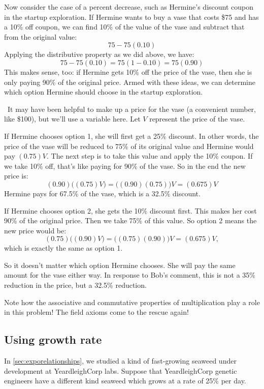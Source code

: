 Now consider the case of a percent decrease, such as Hermine's discount coupon in the startup exploration. If Hermine wants to buy a vase that costs \$75 and has a 10\% off coupon, we can find 10\% of the value of the vase and subtract that from the original value: \[75 - 75(0.10)\] Applying the distributive property as we did above, we have: \[75 - 75(0.10) = 75(1-0.10) = 75(0.90)\] This makes sense, too: if Hermine gets 10\% off the price of the vase, then she is only paying 90\% of the original price. Armed with these ideas, we can determine which option Hermine should choose in the startup exploration.

\begin{boxex}
\exsoln\ It may have been helpful to make up a price for the vase (a convenient number, like \$100), but we'll use a variable here. Let $V$ represent the price of the vase.

If Hermine chooses option 1, she will first get a 25\% discount. In other words, the price of the vase will be reduced to 75\% of its original value and Hermine would pay $(0.75)V$. The next step is to take this value and apply the 10\% coupon. If we take 10\% off, that's like paying for 90\% of the vase. So in the end the new price is: \[(0.90)\bigl((0.75)V\bigr) = \bigl((0.90)(0.75)\bigr)V= (0.675)V\] Hermine pays for 67.5\% of the vase, which is a 32.5\% discount.

If Hermine chooses option 2, she gets the 10\% discount first. This makes her cost 90\% of the original price. Then we take 75\% of this value. So option 2 means the new price would be: \[(0.75)\bigl((0.90)V\bigr) = \bigl((0.75)(0.90)\bigr)V = (0.675)V,\] which is exactly the same as option 1.

So it doesn't matter which option Hermine chooses. She will pay the same amount for the vase either way. In response to Bob's comment, this is not a 35\% reduction in the price, but a 32.5\% reduction.
\end{boxex}

Note how the associative and commutative properties of multiplication play a role in this problem! The field axioms come to the rescue again!

\subsection{Using growth rate}

In \cref{sec:exporelationships}, we studied a kind of fast-growing seaweed under development at YeardleighCorp labs. Suppose that YeardleighCorp genetic engineers have a different kind seaweed which grows at a rate of 25\% per day.


